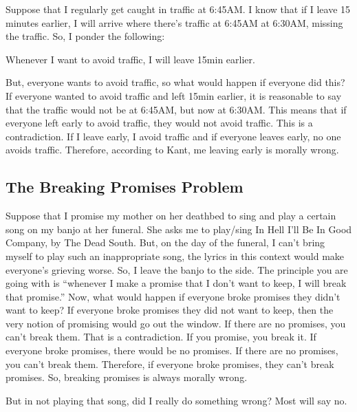 Suppose that I regularly get caught in traffic at 6:45AM. I know that if I leave 15 minutes earlier, I will arrive where there’s traffic at 6:45AM at 6:30AM, missing the traffic. So, I ponder the following:
\begin{center}
    Whenever I want to avoid traffic, I will leave 15min earlier.
\end{center}
But, everyone wants to avoid traffic, so what would happen if everyone did this? If everyone wanted to avoid traffic and left 15min earlier, it is reasonable to say that the traffic would not be at 6:45AM, but now at 6:30AM. This means that if everyone left early to avoid traffic, they would not avoid traffic. This is a contradiction. If I leave early, I avoid traffic and if everyone leaves early, no one avoids traffic. Therefore, according to Kant, me leaving early is morally wrong.
\subsection{The Breaking Promises Problem}

Suppose that I promise my mother on her deathbed to sing and play a certain song on my banjo at her funeral. She asks me to play/sing In Hell I'll Be In Good Company, by The Dead South. But, on the day of the funeral, I can't bring myself to play such an inappropriate song, the lyrics in this context would make everyone's grieving worse. So, I leave the banjo to the side. The principle you are going with is “whenever I make a promise that I don’t want to keep, I will break that promise.” Now, what would happen if everyone broke promises they didn’t want to keep? If everyone broke promises they did not want to keep, then the very notion of promising would go out the window. If there are no promises, you can’t break them. That is a contradiction. If you promise, you break it. If everyone broke promises, there would be no promises. If there are no promises, you can’t break them. Therefore, if everyone broke promises, they can’t break promises. So, breaking promises is always morally wrong.

But in not playing that song, did I really do something wrong? Most will say no.

